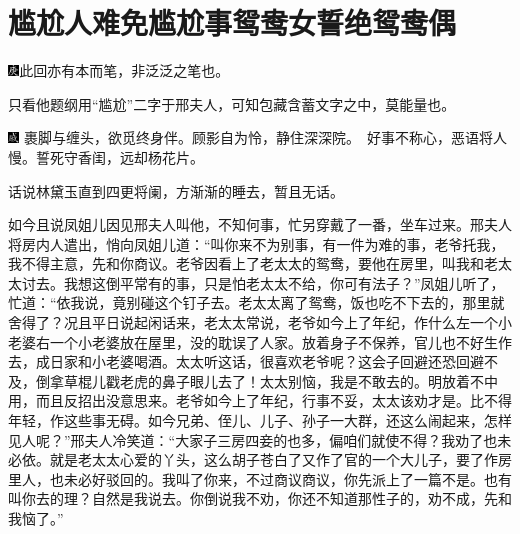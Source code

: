 

\chapter{尴尬人难免尴尬事\hspace{.5em}鸳鸯女誓绝鸳鸯偶}

{\includegraphics[width=3mm]{../Images/00004}此回亦有本而笔，非泛泛之笔也。}

{只看他题纲用``尴尬''二字于邢夫人，可知包藏含蓄文字之中，莫能量也。}

{\includegraphics[width=3mm]{../Images/00005}  \kaishu 裹脚与缠头，欲觅终身伴。顾影自为怜，静住深深院。　好事不称心，恶语将人慢。誓死守香闺，远却杨花片。}

话说林黛玉直到四更将阑，方渐渐的睡去，暂且无话。

如今且说凤姐儿因见邢夫人叫他，不知何事，忙另穿戴了一番，坐车过来。邢夫人将房内人遣出，悄向凤姐儿道：``叫你来不为别事，有一件为难的事，老爷托我，我不得主意，先和你商议。老爷因看上了老太太的鸳鸯，要他在房里，叫我和老太太讨去。我想这倒平常有的事，只是怕老太太不给，你可有法子？''凤姐儿听了，忙道：``依我说，竟别碰这个钉子去。老太太离了鸳鸯，饭也吃不下去的，那里就舍得了？况且平日说起闲话来，老太太常说，老爷如今上了年纪，作什么左一个小老婆右一个小老婆放在屋里，没的耽误了人家。放着身子不保养，官儿也不好生作去，成日家和小老婆喝酒。太太听这话，很喜欢老爷呢？这会子回避还恐回避不及，倒拿草棍儿戳老虎的鼻子眼儿去了！太太别恼，我是不敢去的。明放着不中用，而且反招出没意思来。老爷如今上了年纪，行事不妥，太太该劝才是。比不得年轻，作这些事无碍。如今兄弟、侄儿、儿子、孙子一大群，还这么闹起来，怎样见人呢？''邢夫人冷笑道：``大家子三房四妾的也多，偏咱们就使不得？我劝了也未必依。就是老太太心爱的丫头，这么胡子苍白了又作了官的一个大儿子，要了作房里人，也未必好驳回的。我叫了你来，不过商议商议，你先派上了一篇不是。也有叫你去的理？自然是我说去。你倒说我不劝，你还不知道那性子的，劝不成，先和我恼了。''


